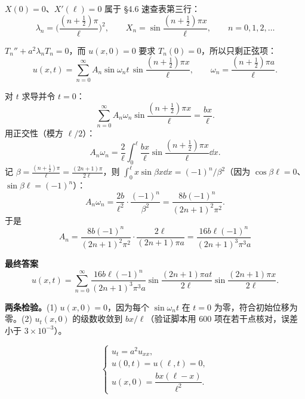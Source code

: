 \documentclass[11pt]{ctexart}
\begin{document}
$X(0)=0$、$X'(\ell)=0$ 属于 \S4.6 速查表第三行：
\begin{equation}
  \lambda_n=\Big(\frac{(n+\frac12)\pi}{\ell}\Big)^2,\qquad
  X_n=\sin\frac{(n+\frac12)\pi x}{\ell},\qquad n=0,1,2,\dots
\end{equation}

$T_n''+a^2\lambda_nT_n=0$，而 $u(x,0)=0$ 要求 $T_n(0)=0$，所以只剩正弦项：
\begin{equation}
  u(x,t)=\sum_{n=0}^{\infty}A_n\sin\omega_nt\,\sin\frac{(n+\frac12)\pi x}{\ell},
  \qquad \omega_n=\frac{(n+\frac12)\pi a}{\ell}.
\end{equation}

对 $t$ 求导并令 $t=0$：
\begin{equation}
  \sum_{n=0}^{\infty}A_n\omega_n\sin\frac{(n+\frac12)\pi x}{\ell}=\frac{bx}{\ell}.
\end{equation}
用正交性（模方 $\ell/2$）：
\begin{equation}
  A_n\omega_n=\frac{2}{\ell}\int_0^{\ell}\frac{bx}{\ell}\sin\frac{(n+\frac12)\pi x}{\ell}\dd x .
\end{equation}
记 $\beta=\frac{(n+\frac12)\pi}{\ell}=\frac{(2n+1)\pi}{2\ell}$，则 $\int_0^\ell x\sin\beta x\dd x=(-1)^n/\beta^2$（因为 $\cos\beta\ell=0$、$\sin\beta\ell=(-1)^n$）：
\begin{equation}
  A_n\omega_n=\frac{2b}{\ell^2}\cdot\frac{(-1)^n}{\beta^2}
  =\frac{8b(-1)^n}{(2n+1)^2\pi^2}.
\end{equation}
于是
\begin{equation}
  \boxed{\;A_n=\frac{8b(-1)^n}{(2n+1)^2\pi^2}\cdot\frac{2\ell}{(2n+1)\pi a}
  =\frac{16b\ell(-1)^n}{(2n+1)^3\pi^3a}\;}
\end{equation}

\textbf{最终答案}
\begin{equation}
  u(x,t)=\sum_{n=0}^{\infty}\frac{16b\ell(-1)^n}{(2n+1)^3\pi^3a}
  \sin\frac{(2n+1)\pi at}{2\ell}\sin\frac{(2n+1)\pi x}{2\ell}.
\end{equation}

\textbf{两条检验。}(1) $u(x,0)=0$，因为每个 $\sin\omega_n t$ 在 $t=0$ 为零，符合初始位移为零。(2) $u_t(x,0)$ 的级数收敛到 $bx/\ell$（验证脚本用 600 项在若干点核对，误差小于 $3\times10^{-3}$）。


\begin{equation}
  \begin{cases}
    u_t=a^2u_{xx},\\
    u(0,t)=u(\ell,t)=0,\\
    u(x,0)=\dfrac{bx(\ell-x)}{\ell^2}.
  \end{cases}
\end{equation}
\end{document}
